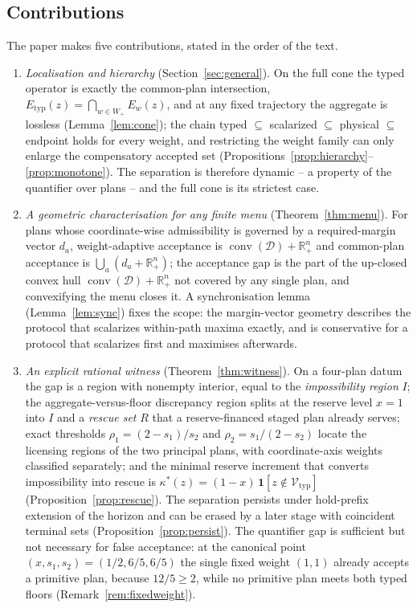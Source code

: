 \documentclass[preprint,11pt,authoryear]{elsarticle}
\theoremstyle{definition}
\theoremstyle{remark}
\newcommand{\Etyp}{E_{\mathrm{typ}}}
\newcommand{\Vtyp}{\mathcal{V}_{\mathrm{typ}}}
\newcommand{\Wp}{W_+}
\newcommand{\conv}{\operatorname{conv}}
\newcommand{\Rp}{\mathbb{R}^n_+}
\begin{document}
\pagebreak
\subsection{Contributions}

The paper makes five contributions, stated in the order of the text.
\begin{enumerate}[leftmargin=2em,label=(\roman*)]
\item \emph{Localisation and hierarchy} (Section~\ref{sec:general}). On the full cone the typed operator is exactly the common-plan intersection, $\Etyp(z)=\bigcap_{w\in\Wp}E_w(z)$, and at any fixed trajectory the aggregate is lossless (Lemma~\ref{lem:cone}); the chain typed $\subseteq$ scalarized $\subseteq$ physical $\subseteq$ endpoint holds for every weight, and restricting the weight family can only enlarge the compensatory accepted set (Propositions~\ref{prop:hierarchy}--\ref{prop:monotone}). The separation is therefore dynamic -- a property of the quantifier over plans -- and the full cone is its strictest case.
\item \emph{A geometric characterisation for any finite menu} (Theorem~\ref{thm:menu}). For plans whose coordinate-wise admissibility is governed by a required-margin vector $d_a$, weight-adaptive acceptance is $\conv(\mathcal D)+\Rp$ and common-plan acceptance is $\bigcup_a(d_a+\Rp)$; the acceptance gap is the part of the up-closed convex hull $\conv(\mathcal D)+\Rp$ not covered by any single plan, and convexifying the menu closes it. A synchronisation lemma (Lemma~\ref{lem:sync}) fixes the scope: the margin-vector geometry describes the protocol that scalarizes within-path maxima exactly, and is conservative for a protocol that scalarizes first and maximises afterwards.
\item \emph{An explicit rational witness} (Theorem~\ref{thm:witness}). On a four-plan datum the gap is a region with nonempty interior, equal to the \emph{impossibility region} $I$; the aggregate-versus-floor discrepancy region splits at the reserve level $x=1$ into $I$ and a \emph{rescue set} $R$ that a reserve-financed staged plan already serves; exact thresholds $\rho_1=(2-s_1)/s_2$ and $\rho_2=s_1/(2-s_2)$ locate the licensing regions of the two principal plans, with coordinate-axis weights classified separately; and the minimal reserve increment that converts impossibility into rescue is $\kappa^*(z)=(1-x)\,\mathbf 1[z\notin\Vtyp]$ (Proposition~\ref{prop:rescue}). The separation persists under hold-prefix extension of the horizon and can be erased by a later stage with coincident terminal sets (Proposition~\ref{prop:persist}). The quantifier gap is sufficient but not necessary for false acceptance: at the canonical point $(x,s_1,s_2)=(1/2,6/5,6/5)$ the single fixed weight $(1,1)$ already accepts a primitive plan, because $12/5\ge2$, while no primitive plan meets both typed floors (Remark~\ref{rem:fixedweight}).

\end{enumerate}
\end{document}
